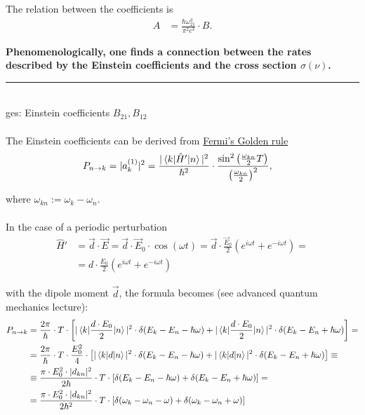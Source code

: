 \documentclass{article}
\newcommand{\lr}[1]{\left(#1\right)}
\newcommand{\lreck}[1]{\left[#1\right]}
\begin{document}
The relation between the coefficients is
	\begin{align*}
		A &= \frac{\hbar \omega_{21}^3}{\pi^2 c^3} \cdot B.
	\end{align*}

	\textbf{Phenomenologically, one finds a connection between the rates described by the Einstein coefficients and the cross section $\sigma(\nu)$.}


\newpage


{\color{violet}
\hrule
	\\
	ges: Einstein coefficients $B_{21}, B_{12}$\\
	\\
	The Einstein coefficients can be derived from \underline{Fermi's Golden rule}
		\begin{align*}
			P_{n\to k} &= |a_k^{(1)}|^2 = \frac{ | \braket{ k | \hat{H}' | n } |^2 }{\hbar^2} \cdot \frac{ \sin^2\lr{ \frac{\omega_{kn}}{2} T } }{ \lr{ \frac{\omega_{kn}}{2} }^2 },
		\end{align*}
	
	where $\omega_{kn} := \omega_k - \omega_n$.\\
	\\
	In the case of a periodic perturbation 
		\begin{align*}
			\hat{H}' &= \vec{d} \cdot \vec{E} = \vec{d} \cdot \vec{E}_0 \cdot \cos(\omega t) = \vec{d} \cdot \frac{\vec{E}_0}{2} \lr{ e^{i\omega t} + e^{-i\omega t} } = \\
			&= d \cdot \frac{E_0}{2} \lr{ e^{i\omega t} + e^{-i\omega t} }
		\end{align*}

	with the dipole moment $\vec{d}$, the formula becomes (see advanced quantum mechanics lecture):
		\begin{align*}
			P_{n\to k} &= \frac{2\pi}{\hbar} \cdot T \cdot \lreck{ |\braket{ k | \frac{d \cdot E_0}{2} | n }|^2 \cdot \delta ( E_k - E_n - \hbar\omega ) + | \braket{ k | \frac{d \cdot E_0}{2} | n }|^2 \cdot \delta ( E_k - E_n + \hbar\omega ) } = \\
			&= \frac{2\pi}{\hbar} \cdot T \cdot \frac{E_0^2}{4} \cdot \lreck{ |\braket{ k | d | n }|^2 \cdot \delta ( E_k - E_n - \hbar\omega ) + | \braket{ k | d | n }|^2 \cdot \delta ( E_k - E_n + \hbar\omega ) } \equiv \\
			&\equiv \frac{\pi \cdot E_0^2 \cdot |d_{kn}|^2}{2\hbar} \cdot T \cdot \lreck{ \delta ( E_k - E_n - \hbar\omega ) + \delta ( E_k - E_n + \hbar\omega ) } = \\
			&= \frac{\pi \cdot E_0^2 \cdot |d_{kn}|^2}{2\hbar^2} \cdot T \cdot \lreck{ \delta ( \omega_k - \omega_n - \omega ) + \delta ( \omega_k - \omega_n + \omega ) }
		\end{align*}

}
\end{document}
